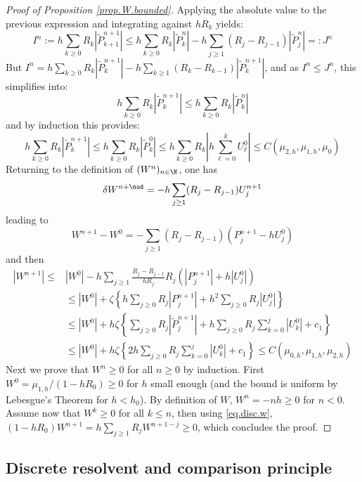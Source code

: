 \documentclass[]{jnsao}
\renewcommand{\tr}{R}
\newcommand{\tP}{\tilde{P}}
\begin{document}
\begin{proof}[Proof of Proposition \ref{prop.W.bounded}]
 	Applying the absolute value to the previous expression and integrating against $h \tr_k$ yields:
 	$$
 	I^n:= h \sum_{k\geq 0} \tr_k |\tP^{n+1}_{k+1}|  \leq h \sum_{k\geq 0} \tr_k |\tP_k^n|   
	- h \sum_{j\geq 1} (\tr_j-\tr_{j-1}) | \tP_j^n |  =: J^n
 	$$ 
 	But 
 	$I^n = h \sum_{k\geq 0} \tr_k |\tP^{n+1}_{k}| - h \sum_{k\geq 1}( \tr_k-\tr_{k-1}) |\tP^{n+1}_{k}| $, 
	and as $I^n \leq J^n$, this simplifies into:
 	$$
 	h \sum_{k\geq 0} \tr_k |\tP^{n+1}_{k}| \leq h \sum_{k\geq 0} \tr_k |\tP^{n}_{k}| %
 	$$
 	and by induction this provides:
 	$$
 	h \sum_{k\geq 0} \tr_k |\tP^{n+1}_{k}|  
 	\leq h \sum_{k\geq 0} \tr_k |\tP^{0}_{k}| %
 	\leq  h \sum_{k\geq 0} \tr_k \left|  h \sum_{\ell=0}^k U^0_\ell \right| %
 	\leq C(\mu_{2,h}, \mu_{1,h},\mu_0) 
 	$$
 	Returning to the definition of $(W^n)_{n\in\N}$,  one has 
 	$$
 	\delta W^{n+\nud} = - h \sum_{j\geq 1} (\tr_j-\tr_{j-1})U^{n+1}_j
 	$$
 	leading to 
 	$$
 	W^{n+1}-W^0 = -  \sum_{j\geq 1} (\tr_j-\tr_{j-1})(P^{n+1}_j- h U^0_j)
 	$$
 	and then 
 	$$
 \begin{aligned}
 		| W^{n+1}| \leq&  | W^0 | - h \sum_{j\geq 1} 
 		\frac{\tr_j-\tr_{j-1}}{h \tr_j} \tr_j \left( | P^{n+1}_j | +h | U_j^0 |\right) \\
 	& \leq | W^0 | + \zeta \left\{ h \sum_{j\geq 0}  \tr_j  | P^{n+1}_j | +h^2 \sum_{j\geq 0}  \tr_j    | U_j^0 |\right\}\\
 	& \leq | W^0 | + h \zeta \left\{ \sum_{j\geq 0}  \tr_j  | \tP^{n+1}_j | +h \sum_{j\geq 0}  \tr_j    \sum_{k=0}^{j} \left| U_k^0 \right| + c_1 \right\} \\
 	& \leq | W^0 | + h \zeta \left\{ 2 h \sum_{j\geq 0}  \tr_j    \sum_{k=0}^{j} \left| U_k^0 \right| + c_1 \right\} 	
 	\leq C(\mu_{0,h},\mu_{1,h},\mu_{2,h}) %
 \end{aligned}
 	$$
Next we prove that $W^n \geq 0$ for all $n\geq 0$ by induction. 
First $W^0=\mu_{1,h}/(1-h \tr_0) \geq 0$ for $h$ 
small enough (and the bound is uniform by Lebesgue's Theorem for $h<h_0$). 
By definition of $W$, 
$W^{n} =  -nh \geq 0$ for $n<0$. 
Assume now that $W^k \geq 0$ for all $k \leq n$, then using \eqref{eq.disc.w}, 
$
(1-h\tr_0) W^{n+1} = h \sum_{j\geq 1} \tr_j W^{n+1-j} \geq 0
$, 
which concludes the proof.
 \end{proof}
 
 \subsection{Discrete resolvent and comparison principle}
\end{document}
